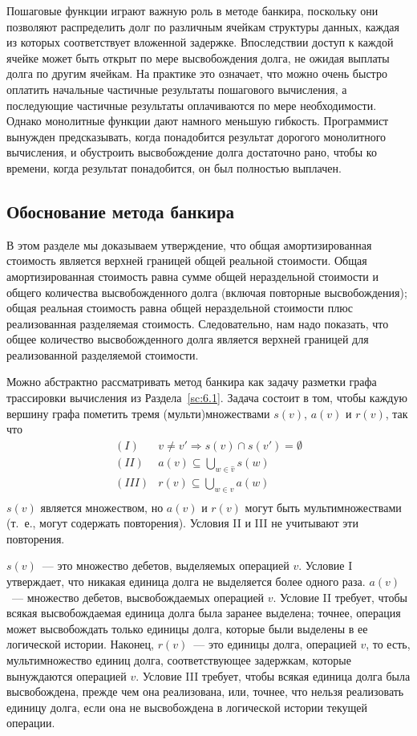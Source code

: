 Пошаговые функции играют важную роль в методе банкира, поскольку они
позволяют распределить долг по различным ячейкам структуры данных,
каждая из которых соответствует вложенной задержке.  Впоследствии
доступ к каждой ячейке может быть открыт по мере высвобождения долга,
не ожидая выплаты долга по другим ячейкам.  На практике это означает,
что можно очень быстро оплатить начальные частичные результаты
пошагового вычисления, а последующие частичные результаты оплачиваются
по мере необходимости.  Однако монолитные функции дают намного меньшую
гибкость.  Программист вынужден предсказывать, когда понадобится
результат дорогого монолитного вычисления, и обустроить высвобождение
долга достаточно рано, чтобы ко времени, когда результат понадобится,
он был полностью выплачен.

\subsection{Обоснование метода банкира}
\label{sc:6.3.1}

В этом разделе мы доказываем утверждение, что общая амортизированная
стоимость является верхней границей общей реальной стоимости. Общая
амортизированная стоимость равна сумме общей нераздельной стоимости и
общего количества высвобожденного долга (включая повторные
высвобождения); общая реальная стоимость равна общей нераздельной
стоимости плюс реализованная разделяемая стоимость. Следовательно, нам
надо показать, что общее количество высвобожденного долга является
верхней границей для реализованной разделяемой стоимости.

Можно абстрактно рассматривать метод банкира как задачу разметки графа
трассировки вычисления из Раздела~\ref{sc:6.1}. Задача состоит в том,
чтобы каждую вершину графа пометить тремя (мульти)множествами $s(v)$,
$a(v)$ и $r(v)$, так что
$$
\begin{array}{cl}
  (I) & v \ne v' \Rightarrow s(v) \cap s(v') = \emptyset \\
  (II) & a(v) \subseteq \bigcup_{w \in \hat{v}} s(w) \\
  (III) & r(v) \subseteq \bigcup_{w \in \hat{v}} a(w) \\
\end{array}
$$
$s(v)$ является множеством, но $a(v)$ и $r(v)$ могут быть
мультимножествами (т.~е., могут содержать повторения). Условия II и
III не учитывают эти повторения.

$s(v)$~--- это множество дебетов, выделяемых операцией $v$. Условие I
утверждает, что никакая единица долга не выделяется более одного
раза. $a(v)$~--- множество дебетов, высвобождаемых операцией
$v$. Условие II требует, чтобы всякая высвобождаемая единица долга
была заранее выделена; точнее, операция может высвобождать только
единицы долга, которые были выделены в ее логической
истории. Наконец, $r(v)$~--- это единицы долга,
 операцией $v$, то есть, мультимножество
единиц долга, соответствующее задержкам, которые вынуждаются операцией
$v$. Условие III требует, чтобы всякая единица долга была
высвобождена, прежде чем она реализована, или, точнее, что нельзя
реализовать единицу долга, если она не высвобождена в логической
истории текущей операции.

